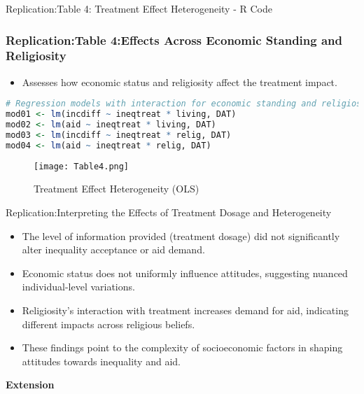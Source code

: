 \documentclass[aspectratio=169,10pt,compress]{beamer}
\begin{document}
\begin{frame}[fragile]{Replication:Table 4: Treatment Effect Heterogeneity - R Code}
  \frametitle{Replication:Table 4:Effects Across Economic Standing and Religiosity}
  
  \begin{itemize}
    \item Assesses how economic status and religiosity affect the treatment impact.
  \end{itemize}
  
  \begin{lstlisting}[language=R]
# Regression models with interaction for economic standing and religiosity
mod01 <- lm(incdiff ~ ineqtreat * living, DAT)
mod02 <- lm(aid ~ ineqtreat * living, DAT)
mod03 <- lm(incdiff ~ ineqtreat * relig, DAT)
mod04 <- lm(aid ~ ineqtreat * relig, DAT)
  \end{lstlisting}
  
  \begin{figure}
    \centering
    \texttt{[image: Table4.png]}
    \caption{Treatment Effect Heterogeneity (OLS)}
  \end{figure}
\end{frame}
\begin{frame}{Replication:Interpreting the Effects of Treatment Dosage and Heterogeneity}
  \begin{itemize}
    \item The level of information provided (treatment dosage) did not significantly alter inequality acceptance or aid demand.
    \item Economic status does not uniformly influence attitudes, suggesting nuanced individual-level variations.
    \item Religiosity's interaction with treatment increases demand for aid, indicating different impacts across religious beliefs.
    \item These findings point to the complexity of socioeconomic factors in shaping attitudes towards inequality and aid.
  \end{itemize}
\end{frame}
\begin{frame}
\centering
\LARGE{\textbf{Extension}}
\end{frame}
\end{document}

